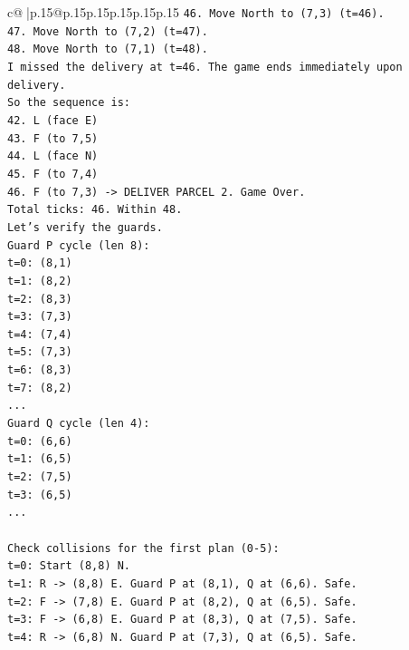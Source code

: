 \documentclass{article}
\begin{document}
{\begin{supertabular}{c@{$\;$}|p{.15\linewidth}@{}p{.15\linewidth}p{.15\linewidth}p{.15\linewidth}p{.15\linewidth}p{.15\linewidth}}
{{{\texttt{46. Move North to (7,3) (t=46).} \\
\texttt{47. Move North to (7,2) (t=47).} \\
\texttt{48. Move North to (7,1) (t=48).} \\
\texttt{I missed the delivery at t=46. The game ends immediately upon delivery.} \\
\texttt{So the sequence is:} \\
\texttt{42. L (face E)} \\
\texttt{43. F (to 7,5)} \\
\texttt{44. L (face N)} \\
\texttt{45. F (to 7,4)} \\
\texttt{46. F (to 7,3) {-}> DELIVER PARCEL 2. Game Over.} \\
\texttt{Total ticks: 46. Within 48.} \\
\texttt{Let's verify the guards.} \\
\texttt{Guard P cycle (len 8):} \\
\texttt{t=0: (8,1)} \\
\texttt{t=1: (8,2)} \\
\texttt{t=2: (8,3)} \\
\texttt{t=3: (7,3)} \\
\texttt{t=4: (7,4)} \\
\texttt{t=5: (7,3)} \\
\texttt{t=6: (8,3)} \\
\texttt{t=7: (8,2)} \\
\texttt{...} \\
\texttt{Guard Q cycle (len 4):} \\
\texttt{t=0: (6,6)} \\
\texttt{t=1: (6,5)} \\
\texttt{t=2: (7,5)} \\
\texttt{t=3: (6,5)} \\
\texttt{...} \\
\\ 
\texttt{Check collisions for the first plan (0{-}5):} \\
\texttt{t=0: Start (8,8) N.} \\
\texttt{t=1: R {-}> (8,8) E. Guard P at (8,1), Q at (6,6). Safe.} \\
\texttt{t=2: F {-}> (7,8) E. Guard P at (8,2), Q at (6,5). Safe.} \\
\texttt{t=3: F {-}> (6,8) E. Guard P at (8,3), Q at (7,5). Safe.} \\
\texttt{t=4: R {-}> (6,8) N. Guard P at (7,3), Q at (6,5). Safe.} \\
}}}
\end{supertabular}}
\end{document}
